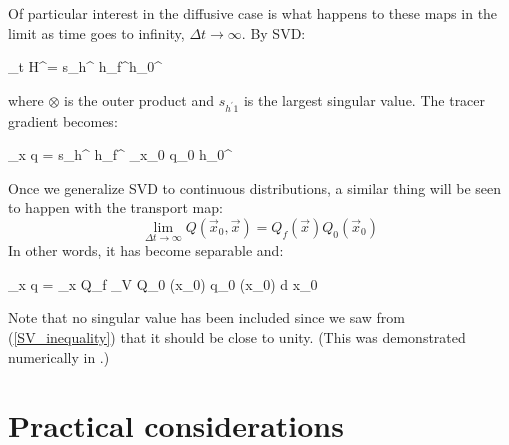 Of particular interest in the diffusive case
is what happens to these maps in the limit as time
goes to infinity, $\Delta t \rightarrow \infty$.
By SVD:
\begin{eqnl}
	\lim_{\Delta t \rightarrow \infty} H^\prime = 
	s_{h^} \vec h_f^\prime \otimes \vec h_0^\prime
\end{eqnl}
where $\otimes$ is the outer product and $s_{h^\prime1}$ is the largest 
singular value. The tracer gradient becomes:
\begin{eqnl}
	\nabla_{\vec x} q = s_{h^} \vec h_f^\prime
	\nabla_{\vec x_0} q_0 \cdot \vec h_0^\prime
\end{eqnl}

Once we generalize SVD to continuous distributions, a similar thing will
be seen to happen with the transport map:
\begin{equation}
	\lim_{\Delta t \rightarrow \infty} Q(\vec x_0, \vec x) =
	Q_f (\vec x) Q_0 (\vec x_0)
	\label{transport_map_separable}
\end{equation}
In other words, it has become separable and:
\begin{eqnl}
	\nabla_{\vec x} q = \nabla_{\vec x} Q_f \int_V Q_0 (\vec x_0) q_0 (\vec x_0) \mathrm d \vec x_0
\end{eqnl}
Note that no singular value has been included since we saw from
(\ref{SV_inequality}) that it should be close to unity.
(This was demonstrated numerically in \citet{Mills2018}.)


\fi

\section{Practical considerations}

\label{practical_considerations}

